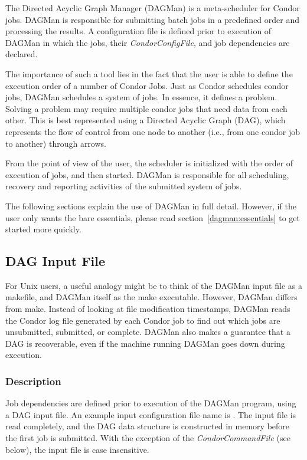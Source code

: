 The Directed Acyclic Graph Manager (DAGMan) is a meta-scheduler for Condor
jobs.  DAGMan is responsible for submitting batch jobs in a predefined order
and processing the results. A configuration file is defined prior to execution
of DAGMan in which the jobs, their \textit{CondorConfigFile}, and job
dependencies are declared.

The importance of such a tool lies in the fact that the user is able to define
the execution order of a number of Condor Jobs. Just as Condor schedules
condor jobs, DAGMan schedules a system of jobs. In essence, it defines a
problem. Solving a problem may require multiple condor jobs that need data
from each other. This is best represented using a Directed Acyclic Graph
(DAG), which represents the flow of control from one node to another (i.e.,
from one condor job to another) through arrows.

From the point of view of the user, the scheduler is initialized with the
order of execution of jobs, and then started. DAGMan is responsible for all
scheduling, recovery and reporting activities of the submitted system of jobs.

The following sections explain the use of DAGMan in full detail.  However, if
the user only wants the bare essentials, please read
section~\ref{dagman:essentials} to get started more quickly.

\subsection{DAG Input File}

For Unix users, a useful analogy might be to think of the DAGMan input file as
a makefile, and DAGMan itself as the make executable.  However, DAGMan differs
from make.  Instead of looking at file modification timestamps, DAGMan reads
the Condor log file generated by each Condor job to find out which jobs are
unsubmitted, submitted, or complete.  DAGMan also makes a guarantee that a DAG
is recoverable, even if the machine running DAGMan goes down during execution.

\subsubsection{Description}
\label{dagman:dagdesc}

Job dependencies are defined prior to execution of the DAGMan program, using a
DAG input file.  An example input configuration file name is .
The input file is read completely, and the DAG data structure is constructed
in memory before the first job is submitted.  With the exception of the
\textit{CondorCommandFile} (see below), the input file is case insensitive.

